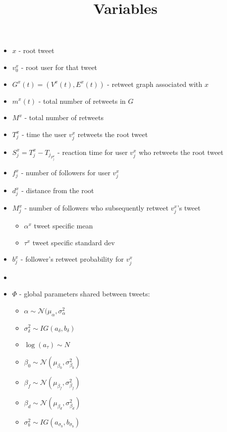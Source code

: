 \documentclass{article}
\begin{document}
\title{Variables}

\begin{itemize}
    \item $x$ - root tweet
    \item $v_{0}^{x}$ - root user for that tweet
    \item $G^{x}(t) = (V^{x}(t), E^{x}(t))$ - retweet graph associated with $x$
    \item $m^{x}(t)$ - total number of retweets in $G$
    \item $M^{x}$ - total number of retweets
    \item $T_{j}^{x}$ - time the user $v_{j}^{x}$ retweets the root tweet
    \item $S_{j}^{x} = T_{j}^{x} - T_{j}_{P_{j}^{x}}$ - reaction time for user $v_{j}^{x}$ who retweets the root tweet
    \item $f_{j}^{x}$ - number of followers for user $v_{j}^{x}$
    \item $d_{j}^{x}$ - distance from the root
    \item $M_{j}^{x}$ - number of followers who subsequently retweet $v_{j}^{x}$'s tweet
    \begin{itemize}
        \item $\alpha^x$ tweet specific mean
        \item $\tau^x$ tweet specific standard dev
    \end{itemize}
    \item $b_{j}^{x}$ - follower's retweet probability for $v_{j}^{x}$
    \item 
    \item $\Phi$ - global parameters shared between tweets:
        \begin{itemize}
            \item $\alpha \sim \mathcal{N}(\mu_\alpha, \sigma_\alpha^2$
            \item $\sigma_\delta^2 \sim IG(a_\delta, b_\delta)$
            \item $\log(a_\tau) \sim N$
            \item $\beta_0 \sim \mathcal{N}(\mu_{\beta_0}, \sigma_{\beta_0}^2)$
            \item $\beta_f \sim \mathcal{N}(\mu_{\beta_f}, \sigma_{\beta_f}^2)$
            \item $\beta_d \sim \mathcal{N}(\mu_{\beta_d}, \sigma_{\beta_d}^2)$
            \item $\sigma_b^2 \sim IG(a_{\sigma_b}, b_{\sigma_b})$
        \end{itemize}
\end{itemize}
\end{document}
